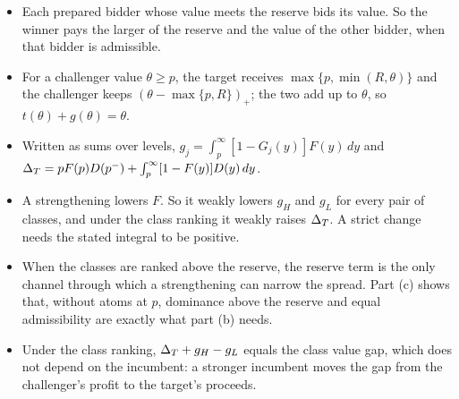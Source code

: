 \begin{chaptersummary}
\begin{itemize}
\item Each prepared bidder whose value meets the reserve bids its value. So the winner pays the larger of the
reserve and the value of the other bidder, when that bidder is admissible.
\item For a challenger value \(\theta\ge p\), the target receives \(\max\{p,\min(R,\theta)\}\) and the challenger
keeps \((\theta-\max\{p,R\})_+\); the two add up to \(\theta\), so \(t(\theta)+g(\theta)=\theta\).
\item Written as sums over levels, \(g_j=\int_p^\infty[1-G_j(y)]F(y)\,dy\) and
\(\Delta_T=pF(p)D(p^-)+\int_p^\infty[1-F(y)]D(y)\,dy\).
\item A strengthening lowers \(F\). So it weakly lowers \(g_H\) and \(g_L\) for every pair of classes, and under
the class ranking it weakly raises \(\Delta_T\). A strict change needs the stated integral to be positive.
\item When the classes are ranked above the reserve, the reserve term is the only channel through which a
strengthening can narrow the spread. Part (c) shows that, without atoms at \(p\), dominance above the reserve and
equal admissibility are exactly what part (b) needs.
\item Under the class ranking, \(\Delta_T+g_H-g_L\) equals the class value gap, which does not depend on the incumbent:
a stronger incumbent moves the gap from the challenger's profit to the target's proceeds.
\end{itemize}
\end{chaptersummary}

\answersection


